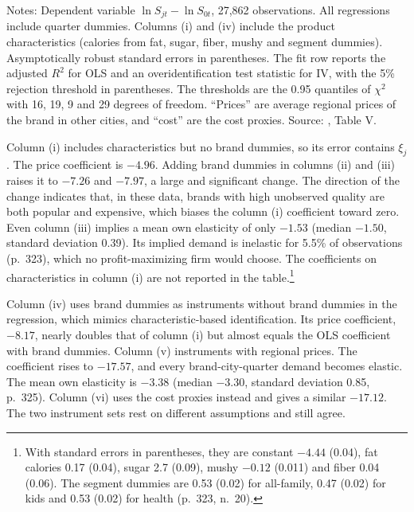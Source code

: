 \begin{table}[htbp]
\smallskip
\begin{minipage}{0.97\linewidth}
\footnotesize Notes: Dependent variable $\ln S_{jt} - \ln S_{0t}$, 27,862 observations. All regressions include
quarter dummies. Columns (i) and (iv) include the product characteristics (calories from fat, sugar, fiber,
mushy and segment dummies). Asymptotically robust standard errors in parentheses. The fit row reports the
adjusted $R^2$ for OLS and an overidentification test statistic for IV, with the 5\% rejection threshold in
parentheses. The thresholds are the 0.95 quantiles of $\chi^2$ with 16, 19, 9 and 29 degrees of freedom. ``Prices'' are average regional prices of the brand in other cities, and ``cost'' are the cost
proxies. Source: \citet{Nevo2001}, Table V.
\end{minipage}
\end{table}

 Column (i) includes characteristics but no brand dummies, so its error contains $\xi_j$. The
price coefficient is $-4.96$. Adding brand dummies in columns (ii) and (iii) raises it to $-7.26$ and $-7.97$,
a large and significant change. The direction of the change indicates that, in these data, brands with high
unobserved quality are both popular and expensive, which biases the column (i) coefficient toward zero. Even column (iii) implies a mean own elasticity of only $-1.53$ (median
$-1.50$, standard deviation 0.39). Its implied demand is inelastic for 5.5\% of observations (p.~323), which no
profit-maximizing firm would choose. The coefficients on characteristics in column (i) are not reported in the
table.\footnote{With standard errors in parentheses, they are constant $-4.44$ (0.04), fat calories 0.17
(0.04), sugar 2.7 (0.09), mushy $-0.12$ (0.011) and fiber 0.04 (0.06). The segment dummies are 0.53 (0.02)
for all-family, 0.47 (0.02) for kids and 0.53 (0.02) for health (p.~323, n.~20).}

 Column (iv) uses brand dummies as instruments without brand dummies in the
regression, which mimics characteristic-based identification. Its price coefficient, $-8.17$, nearly doubles
that of column (i) but almost equals the OLS coefficient with brand dummies. Column (v) instruments with
regional prices. The coefficient rises to $-17.57$, and every brand-city-quarter demand becomes elastic. The
mean own elasticity is $-3.38$ (median $-3.30$, standard deviation 0.85, p.~325). Column (vi) uses the cost
proxies instead and gives a similar $-17.12$. The two instrument sets rest on different assumptions and still
agree.

